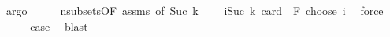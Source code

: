 \begin{isabellebody}
\ argo\isanewline
\ \ \isamarkupfalse%
\ \isamarkupfalse%
\ n{\isacharunderscore}{\kern0pt}subsets{\isacharbrackleft}{\kern0pt}OF\ assms{\isacharcomma}{\kern0pt}\ of\ {\isachardoublequoteopen}Suc\ k{\isachardoublequoteclose}{\isacharbrackright}{\kern0pt}\ \isamarkupfalse%
\ {\isachardoublequoteopen}{\isachardot}{\kern0pt}{\isachardot}{\kern0pt}{\isachardot}{\kern0pt}\ {\isacharequal}{\kern0pt}\ {\isacharparenleft}{\kern0pt}{\isasymSum}i{\isasymle}Suc\ k{\isachardot}{\kern0pt}\ card\ {\isacharparenleft}{\kern0pt}{\isasymUnion}\ F{\isacharparenright}{\kern0pt}\ choose\ i{\isacharparenright}{\kern0pt}{\isachardoublequoteclose}\ \isamarkupfalse%
\ force\isanewline
\ \ \isamarkupfalse%
\ \isamarkupfalse%
\ {\isacharquery}{\kern0pt}case\ \isamarkupfalse%
\ blast\isanewline
{}\isamarkupfalse%
%
\endisatagproof
{\isafoldproof}%
%
\isadelimproof
\isanewline
%
\endisadelimproof
%
\isadelimtheory
\isanewline
%
\endisadelimtheory
%
\isatagtheory
{}\isamarkupfalse%
%
\endisatagtheory
{\isafoldtheory}%
%
\isadelimtheory
%
\endisadelimtheory
%
\end{isabellebody}%
\endinput
